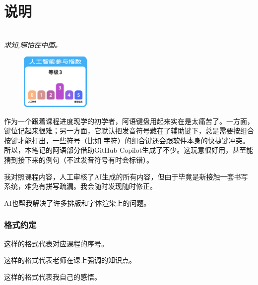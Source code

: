 \chapter*{说明}

\begin{center}

    
    ~\\

    \emph{求知,哪怕在中国。}
\end{center}
\vfill

\begin{figure}
    \includegraphics[width=0.3\textwidth]{img/iiia.pdf}
\end{figure}

作为一个跟着课程进度现学的初学者，阿语键盘用起来实在是太痛苦了。一方面，键位记起来很难；另一方面，它默认把发音符号藏在了辅助键下，总是需要按组合按键才能打出，一些符号（比如  字符）的组合键还会跟软件本身的快捷键冲突。所以，本笔记的阿语部分借助GitHub Copilot生成了不少。这玩意很好用，甚至能猜到接下来的例句（不过发音符号有时会标错）。

我对照课程内容，人工审核了AI生成的所有内容，但由于毕竟是新接触一套书写系统，难免有拼写疏漏。我会随时发现随时修正。

AI也帮我解决了许多排版和字体渲染上的问题。

\subsection*{格式约定}

\lecon{$\cdot$} 这样的格式代表对应课程的序号。

\begin{attention}
    这样的格式代表老师在课上强调的知识点。
\end{attention}

\begin{note}
    这样的格式代表我自己的感悟。
\end{note}